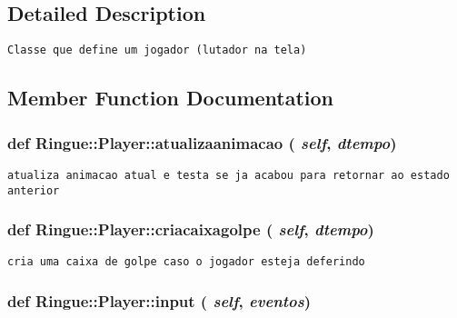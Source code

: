 \subsection{Detailed Description}


\begin{footnotesize}\begin{verbatim}Classe que define um jogador (lutador na tela) \end{verbatim}
\end{footnotesize}
 

\subsection{Member Function Documentation}
\hypertarget{class_ringue_1_1_player_524cfab0489c55f2a6d9b1929cf95d1a}{
\subsubsection[{atualizaanimacao}]{\setlength{\rightskip}{0pt plus 5cm}def Ringue::Player::atualizaanimacao ( {\em self}, \/   {\em dtempo})}}
\label{class_ringue_1_1_player_524cfab0489c55f2a6d9b1929cf95d1a}




\begin{footnotesize}\begin{verbatim}atualiza animacao atual e testa se ja acabou para retornar ao estado anterior \end{verbatim}
\end{footnotesize}
 \hypertarget{class_ringue_1_1_player_5258ca1ee9a65ec941108816dbdce208}{
\subsubsection[{criacaixagolpe}]{\setlength{\rightskip}{0pt plus 5cm}def Ringue::Player::criacaixagolpe ( {\em self}, \/   {\em dtempo})}}
\label{class_ringue_1_1_player_5258ca1ee9a65ec941108816dbdce208}




\begin{footnotesize}\begin{verbatim}cria uma caixa de golpe caso o jogador esteja deferindo \end{verbatim}
\end{footnotesize}
 \hypertarget{class_ringue_1_1_player_864011c781e87c75f0ff5a2e39a9e720}{
\subsubsection[{input}]{\setlength{\rightskip}{0pt plus 5cm}def Ringue::Player::input ( {\em self}, \/   {\em eventos})}}
\label{class_ringue_1_1_player_864011c781e87c75f0ff5a2e39a9e720}





